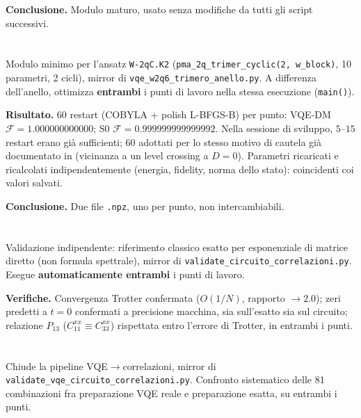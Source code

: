 \documentclass[11pt,a4paper]{article}
\begin{document}
\textbf{Conclusione.} Modulo maturo, usato senza modifiche da tutti gli script successivi.

\section*{\texttt{}}

Modulo minimo per l'ansatz \texttt{W-2qC.K2} (\texttt{pma\_2q\_trimer\_cyclic(2, w\_block)}, 10
parametri, 2 cicli), mirror di \texttt{vqe\_w2q6\_trimero\_anello.py}. A differenza dell'anello,
ottimizza \textbf{entrambi} i punti di lavoro nella stessa esecuzione (\texttt{main()}).

\textbf{Risultato.} $60$ restart (COBYLA + polish L-BFGS-B) per punto: VQE-DM
$\mathcal F=1.000000000000$; S0 $\mathcal F=0.999999999999992$. Nella sessione di sviluppo,
$5$--$15$ restart erano già sufficienti; $60$ adottati per lo stesso motivo di cautela già
documentato in \texttt{} (vicinanza a un level crossing a
$D=0$). Parametri ricaricati e ricalcolati indipendentemente (energia, fidelity, norma dello
stato): coincidenti coi valori salvati.

\textbf{Conclusione.} Due file \texttt{.npz}, uno per punto, non intercambiabili.

\section*{\texttt{}}

Validazione indipendente: riferimento classico esatto per esponenziale di matrice diretto (non
formula spettrale), mirror di \texttt{validate\_circuito\_correlazioni.py}. Esegue
\textbf{automaticamente entrambi} i punti di lavoro.

\textbf{Verifiche.} Convergenza Trotter confermata ($O(1/N)$, rapporto $\to2.0$); zeri predetti a
$t=0$ confermati a precisione macchina, sia sull'esatto sia sul circuito; relazione $P_{13}$
($C_{11}^{xx}\equiv C_{33}^{xx}$) rispettata entro l'errore di Trotter, in entrambi i punti.

\section*{\texttt{}}

Chiude la pipeline VQE$\to$correlazioni, mirror di
\texttt{validate\_vqe\_circuito\_correlazioni.py}. Confronto sistematico delle 81 combinazioni fra
preparazione VQE reale e preparazione esatta, su entrambi i punti.
\end{document}
